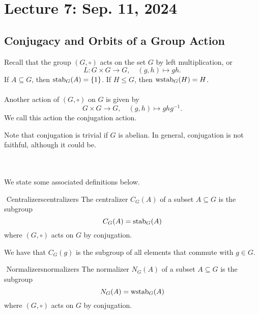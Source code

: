 \pagebreak

\section{Lecture 7: Sep. 11, 2024}

    \subsection{Conjugacy and Orbits of a Group Action}

        Recall that the group \((G,\circ)\) acts on the set \(G\) by left multiplication, or
        \begin{equation*}
            L:G\times G\to G, \quad (g,h)\mapsto gh.
        \end{equation*}
        If \(A\subseteq G\), then \(\operatorname{stab}_G(A)=\{1\}\). If \(H\leq G\), then \(\operatorname{wstab}_G(H)=H\).
        \\
        \\
        Another action of \((G,\circ)\) on \(G\) is given by
        \begin{equation*}
            G\times G\to G, \quad (g,h)\mapsto ghg^{-1}.
        \end{equation*}
        We call this action the conjugation action.
        \begin{remark*}
            Note that conjugation is trivial if \(G\) is abelian. In general, conjugation is not faithful, although it could be.
        \end{remark*}
        \vphantom
        \\
        \\
        We state some associated definitions below.
        \begin{definition}{\Stop\,\,Centralizers}{centralizers}
            The centralizer \(C_G(A)\) of a subset \(A\subseteq G\) is the subgroup
            \begin{equation*}
                C_G(A)=\operatorname{stab}_G(A)
            \end{equation*}
            where \((G,\circ)\) acts on \(G\) by conjugation.
        \end{definition}
        \begin{remark*}
            We have that \(C_G(g)\) is the subgroup of all elements that commute with \(g\in G\).
        \end{remark*}
        \begin{definition}{\Stop\,\,Normalizers}{normalizers}
            The normalizer \(N_G(A)\) of a subset \(A\subseteq G\) is the subgroup
            \begin{equation*}
                N_G(A)=\operatorname{wstab}_G(A)
            \end{equation*}
            where \((G,\circ)\) acts on \(G\) by conjugation.
        \end{definition}

